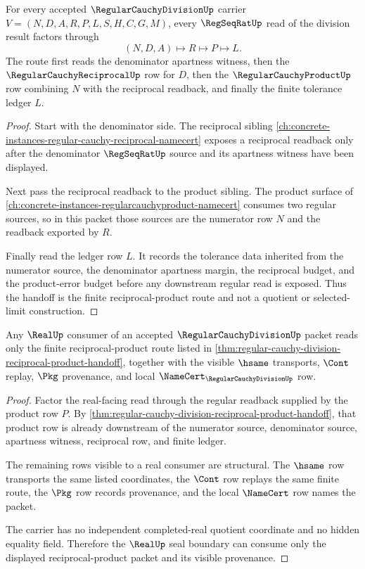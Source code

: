 \begin{theorem}
\label{thm:regular-cauchy-division-reciprocal-product-handoff}
For every accepted $\RegularCauchyDivisionUp$ carrier $V=(N,D,A,R,P,L,S,H,C,G,M)$, every $\RegSeqRatUp$ read of the division result factors through
$$
(N,D,A)\longmapsto R\longmapsto P\longmapsto L.
$$
The route first reads the denominator apartness witness, then the $\RegularCauchyReciprocalUp$ row for $D$, then the $\RegularCauchyProductUp$ row combining $N$ with the reciprocal readback, and finally the finite tolerance ledger $L$.
\end{theorem}
\begin{proof}
Start with the denominator side. The reciprocal sibling \autoref{ch:concrete-instances-regular-cauchy-reciprocal-namecert} exposes a reciprocal readback only after the denominator $\RegSeqRatUp$ source and its apartness witness have been displayed.

Next pass the reciprocal readback to the product sibling. The product surface of \autoref{ch:concrete-instances-regularcauchyproduct-namecert} consumes two regular sources, so in this packet those sources are the numerator row $N$ and the readback exported by $R$.

Finally read the ledger row $L$. It records the tolerance data inherited from the numerator source, the denominator apartness margin, the reciprocal budget, and the product-error budget before any downstream regular read is exposed. Thus the handoff is the finite reciprocal-product route and not a quotient or selected-limit construction.
\end{proof}

\begin{theorem}
\label{thm:regular-cauchy-division-real-seal-boundary}
Any $\RealUp$ consumer of an accepted $\RegularCauchyDivisionUp$ packet reads only the finite reciprocal-product route listed in \autoref{thm:regular-cauchy-division-reciprocal-product-handoff}, together with the visible $\hsame$ transports, $\Cont$ replay, $\Pkg$ provenance, and local $\NameCert_{\RegularCauchyDivisionUp}$ row.
\end{theorem}
\begin{proof}
Factor the real-facing read through the regular readback supplied by the product row $P$. By \autoref{thm:regular-cauchy-division-reciprocal-product-handoff}, that product row is already downstream of the numerator source, denominator source, apartness witness, reciprocal row, and finite ledger.

The remaining rows visible to a real consumer are structural. The $\hsame$ row transports the same listed coordinates, the $\Cont$ row replays the same finite route, the $\Pkg$ row records provenance, and the local $\NameCert$ row names the packet.

The carrier has no independent completed-real quotient coordinate and no hidden equality field. Therefore the $\RealUp$ seal boundary can consume only the displayed reciprocal-product packet and its visible provenance.
\end{proof}

